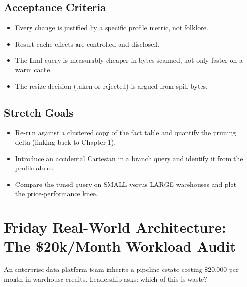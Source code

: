 \subsection*{Acceptance Criteria}
\begin{itemize}
    \item Every change is justified by a specific profile metric, not folklore.
    \item Result-cache effects are controlled and disclosed.
    \item The final query is measurably cheaper in bytes scanned, not only faster on a warm cache.
    \item The resize decision (taken or rejected) is argued from spill bytes.
\end{itemize}

\subsection*{Stretch Goals}
\begin{itemize}
    \item Re-run against a clustered copy of the fact table and quantify the pruning delta (linking back to Chapter 1).
    \item Introduce an accidental Cartesian in a branch query and identify it from the profile alone.
    \item Compare the tuned query on SMALL versus LARGE warehouses and plot the price-performance knee.
\end{itemize}

\section{Friday Real-World Architecture: The \$20k/Month Workload Audit}
An enterprise data platform team inherits a pipeline estate costing \$20{,}000 per month in warehouse credits. Leadership asks: which of this is waste?

